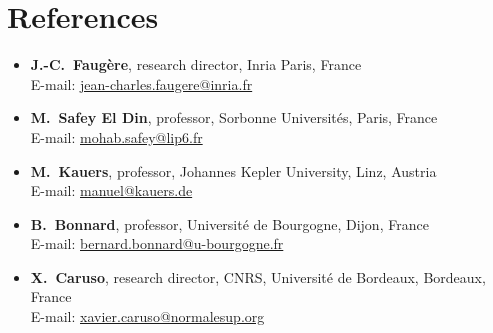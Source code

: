 \documentclass{scrartcl}
\begin{document}
\newpage
\section*{References}

\newcommand{\reference}[3]{%
  \textbf{#1}, #2\\%
  E-mail: \url{#3}
}

\begin{itemize}
  \item \reference{J.-C.~Faugère}{research director, Inria Paris, France}{jean-charles.faugere@inria.fr}
  \item \reference{M.~Safey El Din}{professor, Sorbonne Universités, Paris, France}{mohab.safey@lip6.fr}
  \item \reference{M.~Kauers}{professor, Johannes Kepler University, Linz, Austria}{manuel@kauers.de}
  \item \reference{B.~Bonnard}{professor, Université de Bourgogne, Dijon, France}{bernard.bonnard@u-bourgogne.fr}
  \item \reference{X.~Caruso}{research director, CNRS, Université de Bordeaux, Bordeaux, France}{xavier.caruso@normalesup.org}
\end{itemize}
\end{document}
